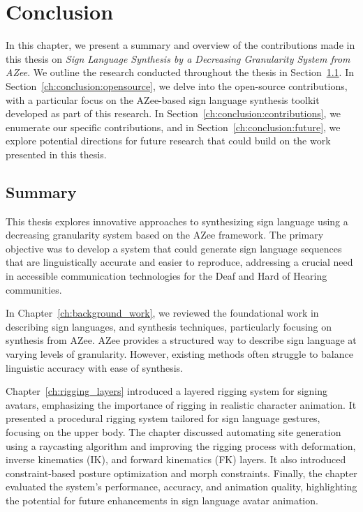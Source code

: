 \documentclass[../../main.tex]{subfiles}
\begin{document}
\chapter{Conclusion}
\label{ch:conclusion}

In this chapter, we present a summary and overview of the contributions made in this thesis on \textit{Sign Language Synthesis by a Decreasing Granularity System from AZee}. We outline the research conducted throughout the thesis in Section~\ref{ch:conclusion:summary}. In Section~\ref{ch:conclusion:opensource}, we delve into the open-source contributions, with a particular focus on the AZee-based sign language synthesis toolkit developed as part of this research. In Section~\ref{ch:conclusion:contributions}, we enumerate our specific contributions, and in Section~\ref{ch:conclusion:future}, we explore potential directions for future research that could build on the work presented in this thesis.

\section{Summary}
\label{ch:conclusion:summary}

This thesis explores innovative approaches to synthesizing sign language using a decreasing granularity system based on the AZee framework. The primary objective was to develop a system that could generate sign language sequences that are linguistically accurate and easier to reproduce, addressing a crucial need in accessible communication technologies for the Deaf and Hard of Hearing communities.

In Chapter~\ref{ch:background_work}, we reviewed the foundational work in describing sign languages, and synthesis techniques, particularly focusing on synthesis from AZee. AZee provides a structured way to describe sign language at varying levels of granularity. However, existing methods often struggle to balance linguistic accuracy with ease of synthesis. 

Chapter~\ref{ch:rigging_layers} introduced a layered rigging system for signing avatars, emphasizing the importance of rigging in realistic character animation. It presented a procedural rigging system tailored for sign language gestures, focusing on the upper body. The chapter discussed automating site generation using a raycasting algorithm and improving the rigging process with deformation, inverse kinematics (IK), and forward kinematics (FK) layers. It also introduced constraint-based posture optimization and morph constraints. Finally, the chapter evaluated the system’s performance, accuracy, and animation quality, highlighting the potential for future enhancements in sign language avatar animation. 
\end{document}
